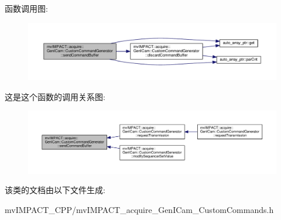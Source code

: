 函数调用图\+:
\nopagebreak
\begin{figure}[H]
\begin{center}
\leavevmode
\includegraphics[width=350pt]{classmv_i_m_p_a_c_t_1_1acquire_1_1_gen_i_cam_1_1_custom_command_generator_afcaaa076529735eb7fd4eb476776f18d_cgraph}
\end{center}
\end{figure}




这是这个函数的调用关系图\+:
\nopagebreak
\begin{figure}[H]
\begin{center}
\leavevmode
\includegraphics[width=350pt]{classmv_i_m_p_a_c_t_1_1acquire_1_1_gen_i_cam_1_1_custom_command_generator_afcaaa076529735eb7fd4eb476776f18d_icgraph}
\end{center}
\end{figure}




该类的文档由以下文件生成\+:\begin{DoxyCompactItemize}
\item 
mv\+I\+M\+P\+A\+C\+T\+\_\+\+C\+P\+P/mv\+I\+M\+P\+A\+C\+T\+\_\+acquire\+\_\+\+Gen\+I\+Cam\+\_\+\+Custom\+Commands.\+h\end{DoxyCompactItemize}
